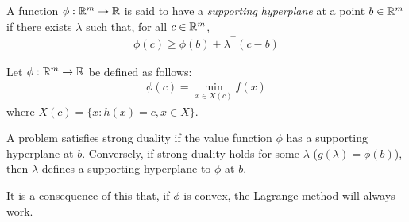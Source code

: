 \documentclass{../template/note}
\begin{document}
    \begin{definition}
        A function $\phi: \mathbb R^m \to \mathbb R$ is said to have a \emph{supporting hyperplane} at a point $b \in \mathbb R^m$ if there exists $\lambda$ such that, for all $c \in \mathbb R^m$,
        \begin{align*}
            \phi(c) \geq \phi(b) + \lambda^\intercal (c-b)
        \end{align*}
    \end{definition}

    \begin{definition}
        Let $\phi: \mathbb R^m \to \mathbb R$ be defined as follows:
        \begin{align*}
            \phi(c) = \min_{x \in X(c)} f(x)
        \end{align*}
        where $X(c) = \{x: h(x) = c, x \in X\}$.        
    \end{definition}
    
    \begin{theorem}
        A problem satisfies strong duality if the value function $\phi$ has a supporting hyperplane at $b$. Conversely, if strong duality holds for some $\lambda$ ($g(\lambda) = \phi(b)$), then $\lambda$ defines a supporting hyperplane to $\phi$ at $b$.
    \end{theorem}
    
    \begin{remark*}
        It is a consequence of this that, if $\phi$ is convex, the Lagrange method will always work.
    \end{remark*}
\end{document}
